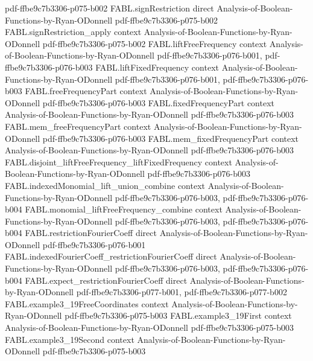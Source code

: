 \begin{theorem}
  {pdf-ffbe9c7b3306-p075-b002}
\proofstep
  {FABL.signRestriction}
  {direct}
  {Analysis-of-Boolean-Functions-by-Ryan-ODonnell}
  {pdf-ffbe9c7b3306-p075-b002}
\proofstep
  {FABL.signRestriction_apply}
  {context}
  {Analysis-of-Boolean-Functions-by-Ryan-ODonnell}
  {pdf-ffbe9c7b3306-p075-b002}
\proofstep
  {FABL.liftFreeFrequency}
  {context}
  {Analysis-of-Boolean-Functions-by-Ryan-ODonnell}
  {pdf-ffbe9c7b3306-p076-b001,
    pdf-ffbe9c7b3306-p076-b003}
\proofstep
  {FABL.liftFixedFrequency}
  {context}
  {Analysis-of-Boolean-Functions-by-Ryan-ODonnell}
  {pdf-ffbe9c7b3306-p076-b001,
    pdf-ffbe9c7b3306-p076-b003}
\proofstep
  {FABL.freeFrequencyPart}
  {context}
  {Analysis-of-Boolean-Functions-by-Ryan-ODonnell}
  {pdf-ffbe9c7b3306-p076-b003}
\proofstep
  {FABL.fixedFrequencyPart}
  {context}
  {Analysis-of-Boolean-Functions-by-Ryan-ODonnell}
  {pdf-ffbe9c7b3306-p076-b003}
\proofstep
  {FABL.mem_freeFrequencyPart}
  {context}
  {Analysis-of-Boolean-Functions-by-Ryan-ODonnell}
  {pdf-ffbe9c7b3306-p076-b003}
\proofstep
  {FABL.mem_fixedFrequencyPart}
  {context}
  {Analysis-of-Boolean-Functions-by-Ryan-ODonnell}
  {pdf-ffbe9c7b3306-p076-b003}
\proofstep
  {FABL.disjoint_liftFreeFrequency_liftFixedFrequency}
  {context}
  {Analysis-of-Boolean-Functions-by-Ryan-ODonnell}
  {pdf-ffbe9c7b3306-p076-b003}
\proofstep
  {FABL.indexedMonomial_lift_union_combine}
  {context}
  {Analysis-of-Boolean-Functions-by-Ryan-ODonnell}
  {pdf-ffbe9c7b3306-p076-b003,
    pdf-ffbe9c7b3306-p076-b004}
\proofstep
  {FABL.monomial_liftFreeFrequency_combine}
  {context}
  {Analysis-of-Boolean-Functions-by-Ryan-ODonnell}
  {pdf-ffbe9c7b3306-p076-b003,
    pdf-ffbe9c7b3306-p076-b004}
\proofstep
  {FABL.restrictionFourierCoeff}
  {direct}
  {Analysis-of-Boolean-Functions-by-Ryan-ODonnell}
  {pdf-ffbe9c7b3306-p076-b001}
\proofstep
  {FABL.indexedFourierCoeff_restrictionFourierCoeff}
  {direct}
  {Analysis-of-Boolean-Functions-by-Ryan-ODonnell}
  {pdf-ffbe9c7b3306-p076-b003,
    pdf-ffbe9c7b3306-p076-b004}
\proofstep
  {FABL.expect_restrictionFourierCoeff}
  {direct}
  {Analysis-of-Boolean-Functions-by-Ryan-ODonnell}
  {pdf-ffbe9c7b3306-p077-b001,
    pdf-ffbe9c7b3306-p077-b002}
\proofstep
  {FABL.example3_19FreeCoordinates}
  {context}
  {Analysis-of-Boolean-Functions-by-Ryan-ODonnell}
  {pdf-ffbe9c7b3306-p075-b003}
\proofstep
  {FABL.example3_19First}
  {context}
  {Analysis-of-Boolean-Functions-by-Ryan-ODonnell}
  {pdf-ffbe9c7b3306-p075-b003}
\proofstep
  {FABL.example3_19Second}
  {context}
  {Analysis-of-Boolean-Functions-by-Ryan-ODonnell}
  {pdf-ffbe9c7b3306-p075-b003}
\proofstep

\end{theorem}
